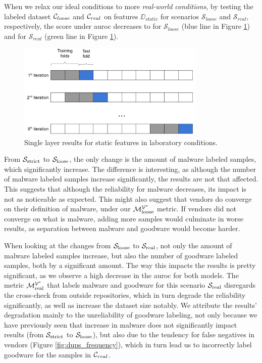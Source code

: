 When we relax our ideal conditions to more \textit{real-world conditions}, by testing the labeled dataset $\mathcal{C}_{loose}$ and $\mathcal{C}_{real}$ on features $\DD_{static}$ for scenarios $\mathcal{S}_{loose}$ and $\mathcal{S}_{real}$, respectively, the score under \gls{auroc} decreases to  for $\mathcal{S}_{loose}$ (blue line in Figure \ref{fig:xval_results}) and  for $\mathcal{S}_{real}$ (green line in Figure \ref{fig:xval_results}).

\begin{figure}[!htb]
	\centering
	\includegraphics[width=0.8\textwidth]{Figures/dia_slidingwindow.png}
	\caption[Single layer results for static features in laboratory conditions.]{Single layer results for static features in laboratory conditions.}
	\label{fig:xval_results}
\end{figure}

From $\mathcal{S}_{\mathrm{strict}}$ to $\mathcal{S}_{\mathrm{loose}}$, the only change is the amount of malware labeled samples, which significantly increase.
The difference is interesting, as although the number of malware labeled samples increase significantly, the results are not that affected.
This suggests that although the reliability for malware decreases, its impact is not as noticeable as expected.
This might also suggest that vendors do converge on their definition of malware, under our $\mathcal{M}_{\mathrm{loose}}^{\mathcal{V}^*}$ metric.
If vendors did not converge on what is malware, adding more samples would culminate in worse results, as separation between malware and goodware would become harder.

When looking at the changes from $\mathcal{S}_{\mathrm{loose}}$ to $\mathcal{S}_{\mathrm{real}}$, not only the amount of malware labeled samples increase, but also the number of goodware labeled samples, both by a significant amount. 
The way this impacts the results is pretty significant, as we observe a high decrease in the \gls{auroc} for both models.
The metric $\mathcal{M}_{\mathrm{real}}^{\mathcal{V}^*}$ that labels malware and goodware for this scenario $\mathcal{S}_{\mathrm{real}}$ disregards the cross-check from outside repositories, which in turn degrade the reliability significantly, as well as increase the dataset size notably.
We attribute the results' degradation mainly to the unreliability of goodware labeling, not only because we have previously seen that increase in malware does not significantly impact results (from $\mathcal{S}_{\mathrm{strict}}$ to $\mathcal{S}_{\mathrm{loose}}$), but also due to the tendency for false negatives in vendors (Figure \ref{fig:dups_frequency}), which in turn lead us to incorrectly label goodware for the samples in $\mathcal{C}_{real}$.


